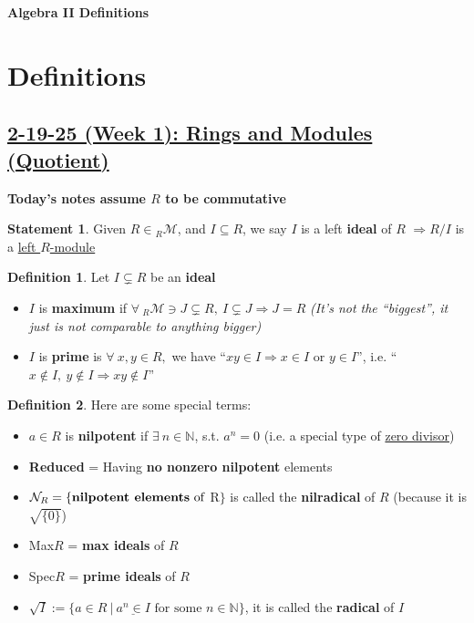 \documentclass[12pt,a4paper]{article}
\theoremstyle{definition}
\newtheorem{definition}{Definition}[subsection]
\newtheorem{statement}{Statement}[subsection]
\begin{document}
\begin{center}
  {\Large \bf Algebra II Definitions}\\[6pt]
\end{center}

\section*{Definitions}
\setcounter{definition}{0}
\setcounter{statement}{0}
\subsection*{\underline{\textbf{2-19-25 (Week 1): Rings and Modules (Quotient)}}}
\textbf{Today's notes assume $R$ to be commutative}
\begin{statement}
  Given $R \in\text{}_R\mathcal{M}$, and $I \subseteq R$, we say $I$ is a left \textbf{ideal} of $R$ $\Rightarrow \boxed{R/I}$ is a \underline{left $R$-module}
\end{statement}
\vspace{0.125em}

\begin{definition}
Let $I \subsetneq R$ be an \textbf{ideal}
  \begin{itemize}
    \item $I$ is \textbf{maximum} if $\forall\ \text{}_R\mathcal{M} \ni J \subsetneq R,\ I \subsetneq J \Rightarrow J = R$ \textit{(It's not the ``biggest'', it just is not comparable to anything bigger)}
    \item $I$ is \textbf{prime} is $\forall\ x, y \in R,$ we have ``$xy \in I \Rightarrow x \in I \text{ or } y \in I$'', i.e. ``$x \notin I,\ y \notin I \Rightarrow xy \notin I$''
  \end{itemize}
\end{definition}
\vspace{0.125em}

\begin{definition}
  Here are some special terms:
  \begin{itemize}
    \item $a \in R$ is \textbf{nilpotent} if $\exists\ n \in \mathbb{N}$, s.t. $a^n = 0$ (i.e. a special type of \underline{zero divisor})
    \item \textbf{Reduced} = Having \textbf{no nonzero nilpotent} elements
    \item $\mathcal{N}_R = \{\text{\textbf{nilpotent elements} of } $R$\}$ is called the \textbf{nilradical} of $R$ (because it is $\sqrt{\{0\}}$)
    \item Max$R$ = {\textbf{max ideals} of $R$}
    \item Spec$R$ = {\textbf{prime ideals} of $R$}
    \item $\sqrt{I} := \{a \in R \ | \ \underline{a^n \in I} \text{ for some } n \in \mathbb{N}\}$, it is called the \textbf{radical} of $I$
  \end{itemize}
\end{definition}
\vspace{0.125em}
\end{document}
